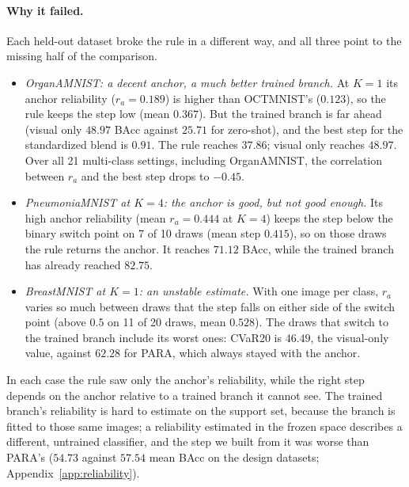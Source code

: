 

\paragraph{Why it failed.}
Each held-out dataset broke the rule in a different way, and all three point to the missing half of the comparison.
\begin{itemize}
  \item \emph{OrganAMNIST: a decent anchor, a much better trained branch.}
  At $K = 1$ its anchor reliability ($r_a = 0.189$) is higher than OCTMNIST's ($0.123$), so the rule keeps the step low (mean $0.367$).
  But the trained branch is far ahead (visual only $48.97$ BAcc against $25.71$ for zero-shot),
  and the best step for the standardized blend is $0.91$.
  The rule reaches $37.86$; visual only reaches $48.97$.
  Over all 21 multi-class settings, including OrganAMNIST, the correlation between $r_a$ and the best step drops to $-0.45$.
  \item \emph{PneumoniaMNIST at $K = 4$: the anchor is good, but not good enough.}
  Its high anchor reliability (mean $r_a = 0.444$ at $K = 4$) keeps the step below the binary switch point on 7 of 10 draws (mean step $0.415$),
  so on those draws the rule returns the anchor. It reaches $71.12$ BAcc, while the trained branch has already reached $82.75$.
  \item \emph{BreastMNIST at $K = 1$: an unstable estimate.}
  With one image per class, $r_a$ varies so much between draws that the step falls on either side of the switch point
  (above $0.5$ on 11 of 20 draws, mean $0.528$).
  The draws that switch to the trained branch include its worst ones:
  CVaR20 is $46.49$, the visual-only value, against $62.28$ for PARA, which always stayed with the anchor.
\end{itemize}
In each case the rule saw only the anchor's reliability, while the right step depends on the anchor relative to a trained branch it cannot see.
The trained branch's reliability is hard to estimate on the support set, because the branch is fitted to those same images;
a reliability estimated in the frozen space describes a different, untrained classifier, and the step we built from it was worse than PARA's
($54.73$ against $57.54$ mean BAcc on the design datasets; Appendix~\ref{app:reliability}).

